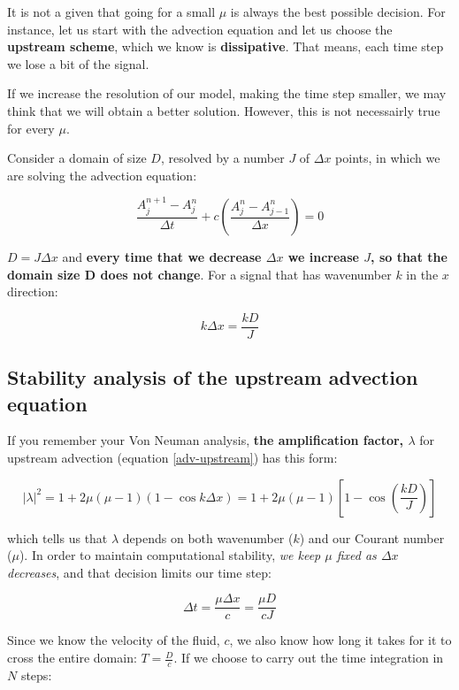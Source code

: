 It is not a given that going for a small $\mu$ is always the best possible decision.
For instance, let us start with the advection equation and let us choose the \textbf{upstream scheme}, which we know is \textbf{dissipative}. That means, each time step we lose a bit of the signal.


If we increase the resolution of our model, making the time step smaller, we may think that we will obtain a better solution. However, this is not necessairly true for every $\mu$.

\medskip
Consider a domain of size $D$, resolved by a number $J$ of $\Delta x$ points, in which we are solving the advection equation:

\begin{equation}
	\frac {A_j^{n+1}-A_j^{n}}{\Delta t} +c \left(  \frac {A_j^{n}-A_{j-1}^{n}}{\Delta x}  \right) = 0
	\label{adv-upstream}
\end{equation}

$D=J \Delta x$ and {\bf every time that we decrease $\Delta x$ we increase $J$, so that the domain size D does not change}. For a signal that has wavenumber $k$ in the $x$ direction:

\begin{equation}
	k \Delta x = \frac {k D}{J}
\end{equation}


\subsection{Stability analysis of the upstream advection equation}


If you remember your Von Neuman analysis, \textbf{the amplification factor, $\lambda$} for upstream advection (equation \ref{adv-upstream})	has this form:

\begin{equation}
	|\lambda|^2 = 1+2\mu(\mu-1)(1-\cos k \Delta x) = 1+2\mu(\mu-1)[1-\cos ( \frac {k D} {J})]
\end{equation}

which tells us that $\lambda$ depends on both wavenumber ($k$) and our Courant number ($\mu$). 
In order to maintain computational stability, \emph{we keep $\mu$ fixed as $\Delta x$ decreases}, and that decision limits our time step:

\begin{equation}
	\Delta t = \frac {\mu \Delta x}{c} = \frac {\mu D}{cJ}
\end{equation}

Since we know the velocity of the fluid, $c$, we also know how long it takes for it to cross the entire domain: $T=\frac {D}{c}$. If we choose to carry out the time integration in $N$ steps:

